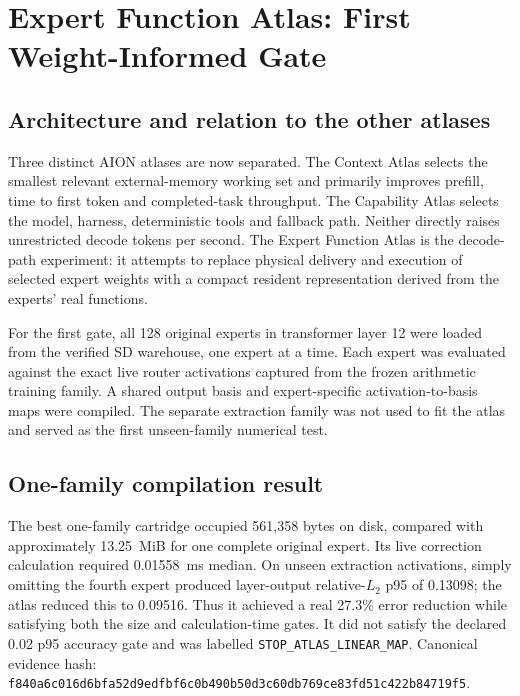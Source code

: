 \section{Expert Function Atlas: First Weight-Informed Gate}
\label{sec:gptoss120b-expert-function-atlas-first-gate}

\subsection{Architecture and relation to the other atlases}

Three distinct AION atlases are now separated.  The Context Atlas selects the
smallest relevant external-memory working set and primarily improves prefill,
time to first token and completed-task throughput.  The Capability Atlas selects
the model, harness, deterministic tools and fallback path.  Neither directly
raises unrestricted decode tokens per second.  The Expert Function Atlas is the
decode-path experiment: it attempts to replace physical delivery and execution
of selected expert weights with a compact resident representation derived from
the experts' real functions.

For the first gate, all 128 original experts in transformer layer 12 were loaded
from the verified SD warehouse, one expert at a time.  Each expert was evaluated
against the exact live router activations captured from the frozen arithmetic
training family.  A shared output basis and expert-specific activation-to-basis
maps were compiled.  The separate extraction family was not used to fit the
atlas and served as the first unseen-family numerical test.

\subsection{One-family compilation result}

The best one-family cartridge occupied 561,358 bytes on disk, compared with
approximately 13.25~MiB for one complete original expert.  Its live correction
calculation required 0.01558~ms median.  On unseen extraction activations, simply
omitting the fourth expert produced layer-output relative-$L_2$ p95 of 0.13098;
the atlas reduced this to 0.09516.  Thus it achieved a real 27.3\% error reduction
while satisfying both the size and calculation-time gates.  It did not satisfy
the declared 0.02 p95 accuracy gate and was labelled
\texttt{STOP\_ATLAS\_LINEAR\_MAP}.  Canonical evidence hash:
\texttt{f840a6c016d6bfa52d9edfbf6c0b490b50d3c60db769ce83fd51c422b84719f5}.

